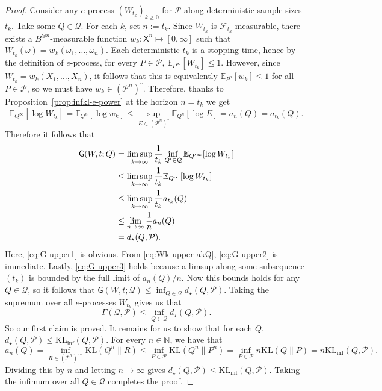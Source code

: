 \documentclass[11pt]{article}
\newcommand{\KL}{\mathrm{KL}}
\newcommand{\KLinf}{\mathrm{KL}_{\mathrm{inf}}}
\newcommand{\E}{\mathbb{E}}
\newcommand{\Pcal}{\mathcal{P}}
\newcommand{\Qcal}{\mathcal{Q}}
\newcommand{\X}{\mathsf{X}}
\theoremstyle{definition}
\theoremstyle{definition}
\begin{document}
\begin{proof}
Consider any $e$-process $(W_{t_k})_{k\ge 0}$ for $\Pcal$ along deterministic sample sizes $t_k$. Take some $Q\in\Qcal$. For each $k$, set $n:=t_k$. Since $W_{t_k}$ is $\mathcal F_{t_k}$-measurable, there exists a $B^{\otimes n}$-measurable function $w_k:\X^n\mapsto[0,\infty]$ such that $W_{t_k}(\omega)=w_k(\omega_1,\dots,\omega_n)$. Each deterministic $t_k$ is a stopping time, hence by the definition of $e$-process, for every $P\in\Pcal$, $\E_{P^\infty}[W_{t_k}]\le 1$. However, since $W_{t_k}=w_k(X_1,\dots,X_n)$, it follows that this is equivalently $\E_{P^n}[w_k]\le 1$ for all $P\in\Pcal$, so we must have $w_k\in(\Pcal^n)^{\circ}$. Therefore, thanks to Proposition~\ref{prop:infkl-e-power} at the horizon $n=t_k$ we get
\begin{equation}\label{eq:Wk-upper-akQ}
\E_{Q^\infty}[\log W_{t_k}]=\E_{Q^n}[\log w_k]\le \sup_{E\in(\Pcal^n)^{\circ}}\E_{Q^n}[\log E]=a_n(Q)=a_{t_k}(Q).    
\end{equation}
Therefore it follows that
\begin{align}
\mathsf G(W,t;Q)&=\limsup_{k\to\infty}\frac{1}{t_k}\inf_{Q'\in\Qcal}\E_{Q'^{\infty}}[\log W_{t_k}]\notag\\
&\le \limsup_{k\to\infty}\frac{1}{t_k}\E_{Q^\infty}[\log W_{t_k}]\label{eq:G-upper1}\\
&\le \limsup_{k\to\infty}\frac{1}{t_k}a_{t_k}(Q)\label{eq:G-upper2}\\
&\le \lim_{n\to\infty}\frac1n a_n(Q)\label{eq:G-upper3}\\
&=d_{\star}(Q,\Pcal)\notag.
\end{align}
Here, \eqref{eq:G-upper1} is obvious. From \eqref{eq:Wk-upper-akQ}, \eqref{eq:G-upper2} is immediate. Lastly, \eqref{eq:G-upper3} holds because a limsup along some subsequence $(t_k)$ is bounded by the full limit of $a_n(Q)/n$. Now this bounds holds for any $Q\in\Qcal$, so it follows that $\mathsf{G}(W,t;\Qcal)\le \inf_{Q\in\Qcal}d_{\star}(Q,\Pcal)$. Taking the supremum over all $e$-processes $W_{t_k}$ gives us that
\[
\Gamma(\Qcal,\Pcal)\le \inf_{Q\in\Qcal}d_{\star}(Q,\Pcal).
\]
So our first claim is proved. It remains for us to show that for each $Q$, $d_{\star}(Q,\Pcal)\le \KLinf(Q,\Pcal)$. For every $n\in\mathbb N$, we have that
\[
a_n(Q)=\inf_{R\in(\Pcal^n)^{\circ\circ}}\KL(Q^n\|R)\le \inf_{P\in\Pcal}\KL(Q^n\|P^n)=\inf_{P\in\Pcal}n\KL(Q\|P)=n\KLinf(Q,\Pcal).
\]
Dividing this by $n$ and letting $n\to\infty$ gives $d_{\star}(Q,\Pcal)\le \KLinf(Q,\Pcal)$. Taking the infimum over all $Q\in\Qcal$ completes the proof.
\end{proof}
\end{document}
